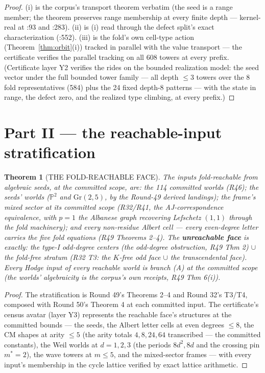 \documentclass[11pt]{article}
\newtheorem{theorem}{Theorem}[section]
\begin{document}
\begin{proof}
(i) is the corpus's transport theorem verbatim (the seed is a range member; the theorem preserves range membership at every finite depth --- kernel-real at :93 and :283). (ii) is (i) read through the defect split's exact characterization (:552). (iii) is the fold's own cell-type action (Theorem~\ref{thm:orbit}(i)) tracked in parallel with the value transport --- the certificate verifies the parallel tracking on all 608 towers at every prefix. (Certificate layer Y2 verifies the rides on the bounded realization model: the seed vector under the full bounded tower family --- all depth $\le 3$ towers over the 8 fold representatives (584) plus the 24 fixed depth-8 patterns --- with the state in range, the defect zero, and the realized type climbing, at every prefix.) \qedhere
\end{proof}

\section{Part II --- the reachable-input stratification}

\begin{theorem}[THE FOLD-REACHABLE FACE]
\label{thm:reach}
The inputs fold-reachable from algebraic seeds, at the committed scope, are: the 114 committed worlds (R46); the seeds' worlds ($\mathbb P^2$ and $\mathrm{Gr}(2,5)$, by the Round-49 derived landings); the frame's mixed sector at its committed scope (R32/R41, the AJ-correspondence equivalence, with $p=1$ the Albanese graph recovering Lefschetz $(1,1)$ through the fold machinery); and every non-residue Albert cell --- every even-degree letter carries the five fold equations (R49 Theorems 2--4). The \textbf{unreachable face} is exactly: the type-I odd-degree centers (the odd-degree obstruction, R49 Thm 2) $\cup$ the fold-free stratum (R32 T3: the $K$-free odd face $\cup$ the transcendental face). Every Hodge input of every reachable world is branch (A) at the committed scope (the worlds' algebraicity is the corpus's own receipts, R49 Thm 6(i)).
\end{theorem}

\begin{proof}
The stratification is Round 49's Theorems 2--4 and Round 32's T3/T4, composed with Round 50's Theorem 4 at each committed input. The certificate's census avatar (layer Y3) represents the reachable face's structures at the committed bounds --- the seeds, the Albert letter cells at even degrees $\le 8$, the CM shapes at arity $\le 5$ (the arity totals $4,8,24,64$ transcribed --- the committed constants), the Weil worlds at $d=1,2,3$ (the periods $8d^2,8d$ and the crossing pin $m^*=2$), the wave towers at $m\le 5$, and the mixed-sector frames --- with every input's membership in the cycle lattice verified by exact lattice arithmetic. \qedhere
\end{proof}
\end{document}
